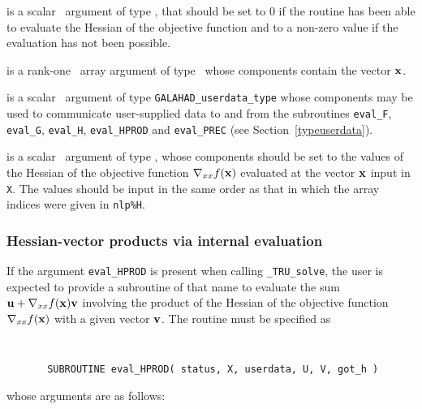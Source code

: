 \documentclass{galahad}
\newcommand{\packagename}{TRU}
\newcommand{\fullpackagename}{\libraryname\_\packagename}
\newcommand{\solver}{{\tt \fullpackagename\_solve}}
\begin{document}
\begin{description}
 is a scalar \intentout\ argument of type \integer,
that should be set to 0 if the routine has been able to evaluate
the Hessian of the objective function
and to a non-zero value if the evaluation has not been possible.

 is a rank-one \intentin\ array argument of type \realdp\
whose components contain the vector ${\mathbf{x}}$.

 is a scalar \intentinout\ argument of type
{\tt GALAHAD\_userdata\_type} whose components may be used
to communicate user-supplied data to and from the
subroutines {\tt eval\_F}, {\tt eval\_G},
{\tt eval\_H}, {\tt eval\_HPROD} and {\tt eval\_PREC}
(see Section~\ref{typeuserdata}).

 is a scalar \intentout\ argument of type \realdp,
whose components should be set to the values of the Hessian
of the objective function $\nabla_{xx} f({\mathbf{x}})$
evaluated at the vector ${\mathbf{x}}$ input in {\tt X}. The values should
be input in the same order as that in which the array indices were
given in {\tt nlp\%H}.

\end{description}


\subsubsection{Hessian-vector products via internal evaluation\label{hvfv}}

If the argument {\tt eval\_HPROD} is present when calling \solver, the
user is expected to provide a subroutine of that name to evaluate the
sum ${\mathbf{u}} + \nabla_{xx} f({\mathbf{x}}) {\mathbf{v}}$ involving the
product of the Hessian of the objective function $\nabla_{xx} f({\mathbf{x}})$
with a given vector ${\mathbf{v}}$.
The routine must be specified as

\def\baselinestretch{0.8}
{\tt
\begin{verbatim}
       SUBROUTINE eval_HPROD( status, X, userdata, U, V, got_h )
\end{verbatim} }
\def\baselinestretch{1.0}
\noindent whose arguments are as follows:
\end{document}
